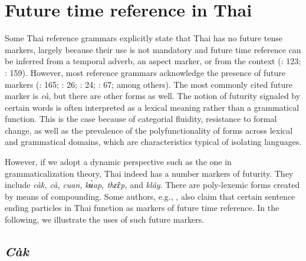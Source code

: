 \documentclass[output=paper,colorlinks,citecolor=brown]{langscibook}
\begin{document}
\section{Future time reference in Thai} \label{sec:khammee:2}

Some Thai reference grammars explicitly state that Thai has no future tense markers, largely because their use is not mandatory and future time reference can be inferred from a temporal adverb, an aspect marker, or from the context (\cite{IwasakiIngkaphirom2005}: 123; \cite{Thiengburanathum2013}: 159). However, most reference grammars acknowledge the presence of future markers (\cite{Noss1964}: 165; \cite{CampbellShaweevongse1972}: 26; \cite{Setthapun1992}: 24; \cite{Smyth2002}: 67; among others). The most commonly cited future marker is \textit{cà}, but there are other forms as well. The notion of futurity signaled by certain words is often interpreted as a lexical meaning rather than a grammatical function. This is the case because of categorial fluidity, resistance to formal change, as well as the prevalence of the polyfunctionality of forms across lexical and grammatical domains, which are characteristics typical of isolating languages.

However, if we adopt a dynamic perspective such as the one in grammaticalization theory, Thai indeed has a number markers of futurity. They include \textit{càk}\textit{,} \textit{cà}\textit{,} \textit{cuan,} \textit{kʉ̀ap, thɛ̂ɛp, }and \textit{klây}. There are poly-lexemic forms created by means of compounding. Some authors, e.g., \citet{Supanvanich1973}, also claim that certain sentence ending particles in Thai function as markers of future time reference. In the following, we illustrate the uses of such future markers. 

\subsection{\textit{Càk}}\label{sec:khammee:2.1}

\end{document}
